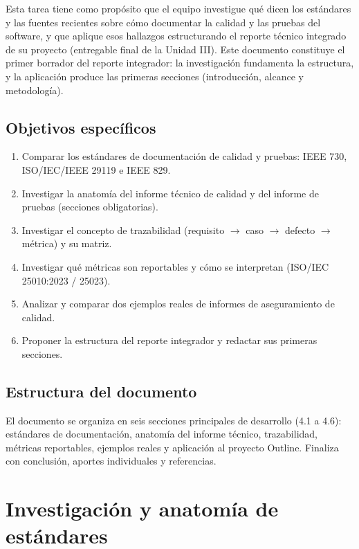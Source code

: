 \documentclass[12pt, letterpaper]{article}
\begin{document}
Esta tarea tiene como propósito que el equipo investigue qué dicen los estándares y las fuentes recientes sobre cómo documentar la calidad y las pruebas del software, y que aplique esos hallazgos estructurando el reporte técnico integrado de su proyecto (entregable final de la Unidad III). Este documento constituye el primer borrador del reporte integrador: la investigación fundamenta la estructura, y la aplicación produce las primeras secciones (introducción, alcance y metodología).

\subsection{Objetivos específicos}

\begin{enumerate}
    \item Comparar los estándares de documentación de calidad y pruebas: IEEE 730, ISO/IEC/IEEE 29119 e IEEE 829.
    \item Investigar la anatomía del informe técnico de calidad y del informe de pruebas (secciones obligatorias).
    \item Investigar el concepto de trazabilidad (requisito $\to$ caso $\to$ defecto $\to$ métrica) y su matriz.
    \item Investigar qué métricas son reportables y cómo se interpretan (ISO/IEC 25010:2023 / 25023).
    \item Analizar y comparar dos ejemplos reales de informes de aseguramiento de calidad.
    \item Proponer la estructura del reporte integrador y redactar sus primeras secciones.
\end{enumerate}

\subsection{Estructura del documento}

El documento se organiza en seis secciones principales de desarrollo (4.1 a 4.6): estándares de documentación, anatomía del informe técnico, trazabilidad, métricas reportables, ejemplos reales y aplicación al proyecto Outline. Finaliza con conclusión, aportes individuales y referencias.

\section{Investigación y anatomía de estándares}
\end{document}
